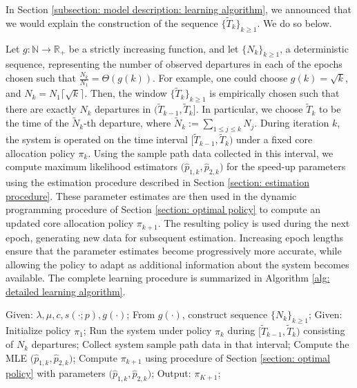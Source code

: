 \documentclass[11pt]{article}
\renewcommand{\thealgorithm}{\arabic{algorithm}}
\theoremstyle{remark}
\theoremstyle{definition}
\numberwithin{equation}{section}
\begin{document}
In Section \ref{subsection: model description: learning algorithm}, we announced that we would explain the construction of the sequence $\big\{ \widetilde{T}_k \big\}_{k \geq 1}$. We do so below.

Let $g:\mathbb{N} \to \mathbb{R}_{+}$ be a strictly increasing function, and let $\{N_k\}_{k \geq 1}$, a deterministic sequence, representing the number of observed departures in each of the epochs chosen such that $\frac{N_k}{N_1} = \Theta(g(k))$.
For example, one could choose $g(k) = \sqrt{k}$, and $N_k = N_1\big\lceil\sqrt{k}\big\rceil$.
Then, the window $\big\{\widetilde{T}_k\big\}_{k \geq 1}$ is empirically chosen such that there are exactly $N_k$ departures in $\big(\widetilde{T}_{k-1}, \widetilde{T}_k\big]$.
In particular, we choose $\widetilde{T}_k$ to be the time of the $\widetilde{N}_k$-th departure, where $ \widetilde{N}_k := \sum_{1 \leq j \leq k} N_j$.
During iteration $k$, the system is operated on the time interval $\big[\widetilde{T}_{k-1}, \widetilde{T}_k\big)$ under a fixed core allocation policy $\pi_k$. 
Using the sample path data collected in this interval, we compute maximum likelihood estimators $\big(\widehat{p}_{1,k}, \widehat{p}_{2,k}\big)$ for the speed-up parameters using the estimation procedure described in Section \ref{section: estimation procedure}. 
These parameter estimates are then used in the dynamic programming procedure of Section \ref{section: optimal policy} to compute an updated core allocation policy $\pi_{k+1}$.
The resulting policy is used during the next epoch, generating new data for subsequent estimation. 
Increasing epoch lengths ensure that the parameter estimates become progressively more accurate, while allowing the policy to adapt as additional information about the system becomes available.
The complete learning procedure is summarized in Algorithm \ref{alg: detailed learning algorithm}.


\begin{algorithm}[H]
    \renewcommand{\thealgorithm}{1a}
    \caption{Detailed learning algorithm}
    \label{alg: detailed learning algorithm}
    \begin{algorithmic}[1]
        \State Given: $\lambda, \mu, c, s(\cdot;p), g(\cdot)$;
        \State From $g(\cdot)$, construct sequence $\big\{N_k\big\}_{k \geq 1}$;
        \State Given: Initialize policy $\pi_1$;
        \State Run the system under policy $\pi_k$ during $\big[\widetilde{T}_{k-1}, \widetilde{T}_k\big)$ consisting of $N_k$ departures;
        \State Collect system sample path data in that interval;
        \State Compute the MLE $\big(\widehat{p}_{1,k},\widehat{p}_{2,k}\big)$;
        \State Compute $\pi_{k+1}$ using procedure of Section \ref{section: optimal policy} with parameters $\big(\widehat{p}_{1,k},\widehat{p}_{2,k}\big)$;
        \EndFor
        \State Output: $\pi_{K+1}$;
    \end{algorithmic}
\end{algorithm}
\end{document}
